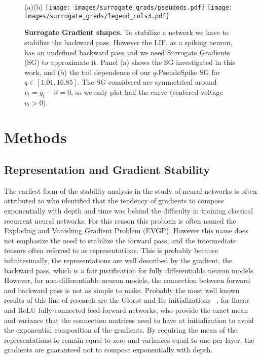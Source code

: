 


\begin{figure}
    {\footnotesize \hspace{-2.5cm}(a)\hspace{3.cm}(b)
    }
    \centering
    \texttt{[image: images/surrogate\_grads/pseudods.pdf]}
    \texttt{[image: images/surrogate\_grads/legend\_cols3.pdf]}
    
    \caption{\textbf{Surrogate Gradient shapes.} To stabilize a network we have to stabilize the backward pass. However the LIF, as a spiking neuron, has an undefined backward pass and we need Surrogate Gradients (SG) to approximate it. Panel (a) shows the SG investigated in this work, and (b) the tail dependence of our $q$-PseudoSpike SG for $q\in[1.01, 16.85]$. The SG considered are symmetrical around $v_t=y_t-\vartheta=0$, so we only plot half the curve (centered voltage $v_t>0$). 
    }
    \label{fig:methodo}
\end{figure}

\section{Methods}


\subsection{Representation and Gradient Stability}
The earliest form of the stability analysis in the study of neural networks is often attributed to \cite{hochreiter1991untersuchungen} who identified that the tendency of gradients to compose exponentially with depth and time was behind the difficulty in training classical recurrent neural networks. For this reason this problem is often named the Exploding and Vanishing Gradient Problem (EVGP). However this name does not emphasize the need to stabilize the forward pass, and the intermediate tensors often referred to as representations. This is probably because infinitesimally, the representations are well described by the gradient, the backward pass, which is a fair justification for fully differentiable neuron models. However, for non-differentiable neuron models, the connection between forward and backward pass is not as simple to make.
Probably the most well known results of this line of research are the Glorot and He initializations ~\cite{glorot2010understanding, he2015delving}, for linear and ReLU fully-connected feed-forward networks, who provide the exact mean and variance that the connection matrices need to have at initialization to avoid the exponential composition of the gradients. By requiring the mean of the representations to remain equal to zero and variances equal to one per layer, the gradients are guaranteed not to compose exponentially with depth. 

